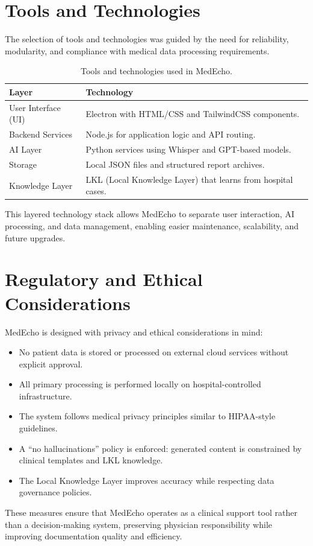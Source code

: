 \section{Tools and Technologies}\label{sec:analysis:tools}

The selection of tools and technologies was guided by the need for reliability, modularity, and compliance with medical data processing requirements.


\begin{table}[ht]
\centering
\renewcommand{\arraystretch}{1.3}
\begin{tabular}{|p{4cm}|p{9cm}|}
\hline
\textbf{Layer} & \textbf{Technology} \\
\hline
User Interface (UI) & Electron with HTML/CSS and TailwindCSS components. \\
\hline
Backend Services & Node.js for application logic and API routing. \\
\hline
AI Layer & Python services using Whisper and GPT-based models. \\
\hline
Storage & Local JSON files and structured report archives. \\
\hline
Knowledge Layer & LKL (Local Knowledge Layer) that learns from hospital cases. \\
\hline
\end{tabular}
\caption{Tools and technologies used in MedEcho.}
\label{tab:tech-stack}
\end{table}
This layered technology stack allows MedEcho to separate user interaction, AI processing, and data management, enabling easier maintenance, scalability, and future upgrades.


\section{Regulatory and Ethical Considerations}\label{sec:analysis:ethics}

MedEcho is designed with privacy and ethical considerations in mind:

\begin{itemize}
    \item No patient data is stored or processed on external cloud services without explicit approval.
    \item All primary processing is performed locally on hospital-controlled infrastructure.
    \item The system follows medical privacy principles similar to HIPAA-style guidelines.
    \item A ``no hallucinations'' policy is enforced: generated content is constrained by clinical templates and LKL knowledge.
    \item The Local Knowledge Layer improves accuracy while respecting data governance policies.
\end{itemize}
These measures ensure that MedEcho operates as a clinical support tool rather than a decision-making system, preserving physician responsibility while improving documentation quality and efficiency.
